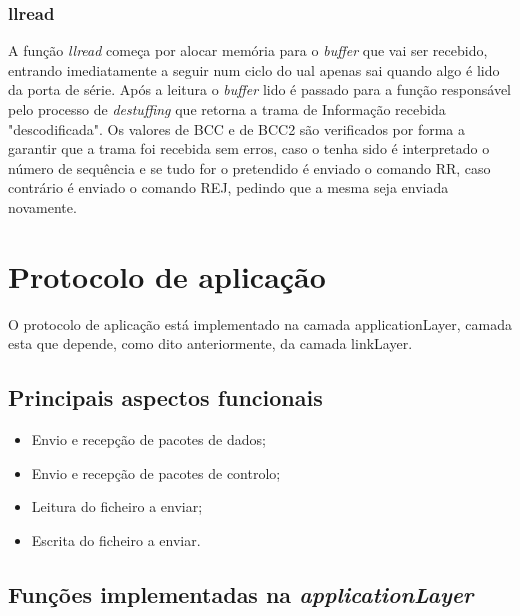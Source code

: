 \documentclass[11pt]{article}
\begin{document}
 \subsubsection{llread}
   
    A função \textit{llread} começa por alocar memória para o \textit{buffer} que vai ser recebido, entrando imediatamente a seguir num ciclo do ual apenas sai quando algo é lido da porta de série.
	Após a leitura o \textit{buffer} lido é passado para a função responsável pelo processo de \textit{destuffing} que retorna a trama de Informação recebida "descodificada". 
	Os valores de BCC e de BCC2 são verificados por forma a garantir que a trama foi recebida sem erros, caso o tenha sido é interpretado o número de sequência e se tudo for o pretendido é enviado o comando RR, caso contrário é enviado o comando REJ, pedindo que a mesma seja enviada novamente.



\newpage
\section{Protocolo de aplicação}

O protocolo de aplicação está implementado na camada applicationLayer, camada esta que depende, como dito anteriormente, da camada linkLayer.

 \subsection{Principais aspectos funcionais}
 \begin{itemize}
  \item Envio e recepção de pacotes de dados;
  \item Envio e recepção de pacotes de controlo;
  \item Leitura do ficheiro a enviar;
  \item Escrita do ficheiro a enviar.
\end{itemize}
  
  \subsection{Funções implementadas na \textit{applicationLayer}}
\end{document}
